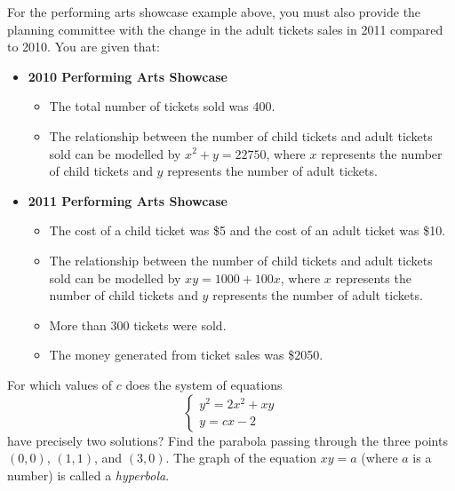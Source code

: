 \begin{questions}
\begin{displaymath}
            \end{displaymath}
   For the performing arts showcase example above, you must
            also provide the planning committee with the change in the adult tickets sales in 2011 compared to 2010. You are
            given that:
            \begin{itemize}
              \item \textbf{2010 Performing Arts Showcase}
                \begin{itemize}
                  \item The total number of tickets sold was 400.
                  \item The relationship between the number of child tickets and adult tickets sold can be modelled by $ x^2 + y = 22750 $, where $x$
                        represents the number of child tickets and $y$ represents the number of adult tickets.
                \end{itemize}
              \item \textbf{2011 Performing Arts Showcase}
                \begin{itemize}
                  \item The cost of a child ticket was \$5 and the cost of an adult ticket was \$10.
                  \item The relationship between the number of child tickets and adult tickets sold can be modelled by $ xy = 1000 + 100x $,
                        where $x$ represents the number of child tickets and $y$ represents the number of adult tickets.
                  \item More than 300 tickets were sold.
                  \item The money generated from ticket sales was \$2050.
                \end{itemize}
            \end{itemize}
  \question For which values of $ c $ does the system of equations
            \begin{displaymath}
              \begin{cases}
                y^2 = 2x^2 + xy\\
                y = cx - 2
              \end{cases}
            \end{displaymath}
            have precisely two solutions?
  \question Find the parabola passing through the three points $ (0,0) $, $ (1,1) $, and $ (3,0) $.
  \question The graph of the equation $ xy = a $ (where $ a $ is a number) is called a \emph{hyperbola}.
    \begin{parts}

\end{parts}
\end{questions}
